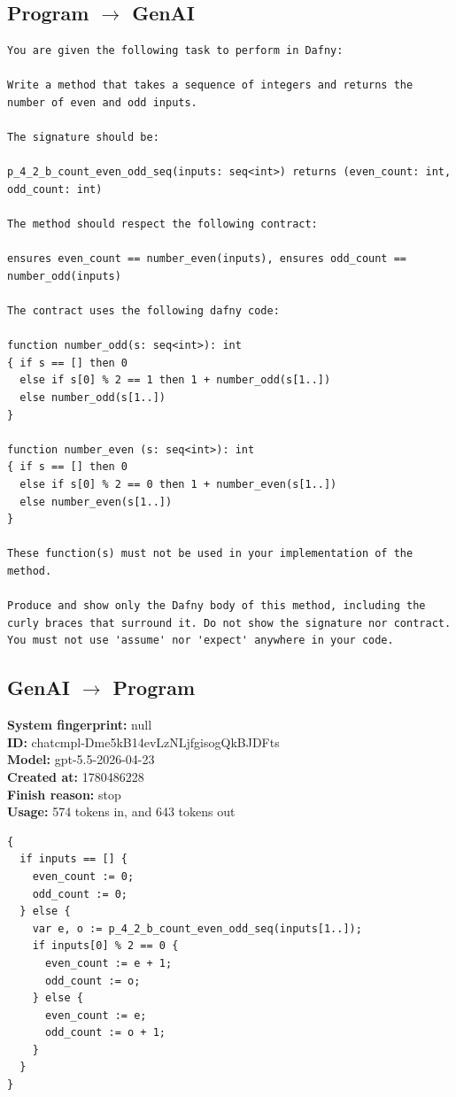 \documentclass{article}
\begin{document}
\subsection*{Program $\rightarrow$ GenAI}
\begin{lstlisting}
You are given the following task to perform in Dafny:

Write a method that takes a sequence of integers and returns the number of even and odd inputs.

The signature should be:

p_4_2_b_count_even_odd_seq(inputs: seq<int>) returns (even_count: int, odd_count: int)

The method should respect the following contract:

ensures even_count == number_even(inputs), ensures odd_count == number_odd(inputs)

The contract uses the following dafny code:

function number_odd(s: seq<int>): int
{ if s == [] then 0
  else if s[0] % 2 == 1 then 1 + number_odd(s[1..])
  else number_odd(s[1..])
}

function number_even (s: seq<int>): int
{ if s == [] then 0
  else if s[0] % 2 == 0 then 1 + number_even(s[1..])
  else number_even(s[1..])
}

These function(s) must not be used in your implementation of the method.

Produce and show only the Dafny body of this method, including the curly braces that surround it. Do not show the signature nor contract. You must not use 'assume' nor 'expect' anywhere in your code.
\end{lstlisting}
\subsection*{GenAI $\rightarrow$ Program}
\textbf{System fingerprint: }null
\\\textbf{ID: }chatcmpl-Dme5kB14evLzNLjfgisogQkBJDFts
\\\textbf{Model: }gpt-5.5-2026-04-23
\\\textbf{Created at: }1780486228
\\\textbf{Finish reason: }stop
\\\textbf{Usage: }574 tokens in, and 643 tokens out
\begin{lstlisting}
{
  if inputs == [] {
    even_count := 0;
    odd_count := 0;
  } else {
    var e, o := p_4_2_b_count_even_odd_seq(inputs[1..]);
    if inputs[0] % 2 == 0 {
      even_count := e + 1;
      odd_count := o;
    } else {
      even_count := e;
      odd_count := o + 1;
    }
  }
}
\end{lstlisting}
\end{document}
